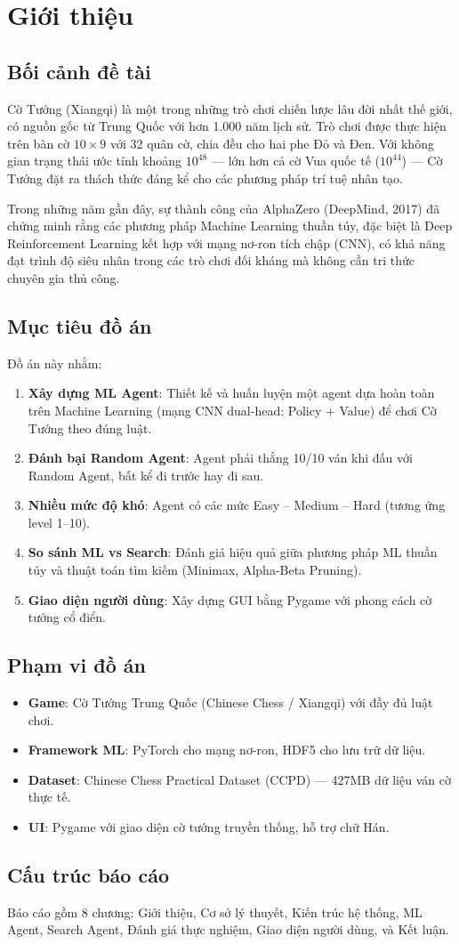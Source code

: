 \section{Giới thiệu}

\subsection{Bối cảnh đề tài}
Cờ Tướng (Xiangqi) là một trong những trò chơi chiến lược lâu đời nhất thế giới, có nguồn gốc từ Trung Quốc với hơn 1.000 năm lịch sử. Trò chơi được thực hiện trên bàn cờ $10 \times 9$ với 32 quân cờ, chia đều cho hai phe Đỏ và Đen. Với không gian trạng thái ước tính khoảng $10^{48}$ --- lớn hơn cả cờ Vua quốc tế ($10^{44}$) --- Cờ Tướng đặt ra thách thức đáng kể cho các phương pháp trí tuệ nhân tạo.

Trong những năm gần đây, sự thành công của AlphaZero (DeepMind, 2017) đã chứng minh rằng các phương pháp Machine Learning thuần túy, đặc biệt là Deep Reinforcement Learning kết hợp với mạng nơ-ron tích chập (CNN), có khả năng đạt trình độ siêu nhân trong các trò chơi đối kháng mà không cần tri thức chuyên gia thủ công.

\subsection{Mục tiêu đồ án}
Đồ án này nhằm:
\begin{enumerate}[label=\arabic*.]
    \item \textbf{Xây dựng ML Agent}: Thiết kế và huấn luyện một agent dựa hoàn toàn trên Machine Learning (mạng CNN dual-head: Policy + Value) để chơi Cờ Tướng theo đúng luật.
    \item \textbf{Đánh bại Random Agent}: Agent phải thắng 10/10 ván khi đấu với Random Agent, bất kể đi trước hay đi sau.
    \item \textbf{Nhiều mức độ khó}: Agent có các mức Easy -- Medium -- Hard (tương ứng level 1--10).
    \item \textbf{So sánh ML vs Search}: Đánh giá hiệu quả giữa phương pháp ML thuần túy và thuật toán tìm kiếm (Minimax, Alpha-Beta Pruning).
    \item \textbf{Giao diện người dùng}: Xây dựng GUI bằng Pygame với phong cách cờ tướng cổ điển.
\end{enumerate}

\subsection{Phạm vi đồ án}
\begin{itemize}
    \item \textbf{Game}: Cờ Tướng Trung Quốc (Chinese Chess / Xiangqi) với đầy đủ luật chơi.
    \item \textbf{Framework ML}: PyTorch cho mạng nơ-ron, HDF5 cho lưu trữ dữ liệu.
    \item \textbf{Dataset}: Chinese Chess Practical Dataset (CCPD) --- 427MB dữ liệu ván cờ thực tế.
    \item \textbf{UI}: Pygame với giao diện cờ tướng truyền thống, hỗ trợ chữ Hán.
\end{itemize}

\subsection{Cấu trúc báo cáo}
Báo cáo gồm 8 chương: Giới thiệu, Cơ sở lý thuyết, Kiến trúc hệ thống, ML Agent, Search Agent, Đánh giá thực nghiệm, Giao diện người dùng, và Kết luận.
